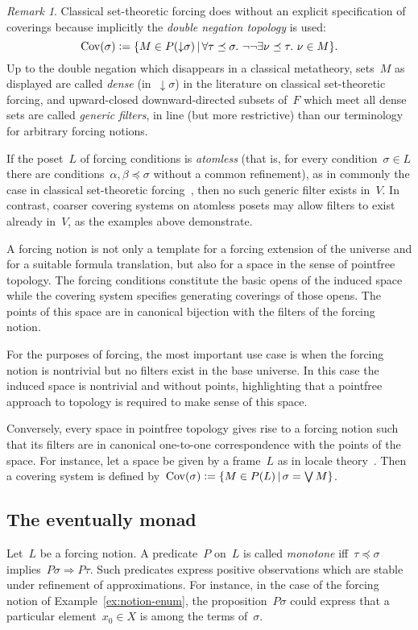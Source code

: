 \documentclass[com,11pt,crcready]{iosart2x}
\theoremstyle{definition}
\theoremstyle{plain}
\theoremstyle{remark}
\newtheorem{remark}[definition]{Remark}
\newcommand{\?}{\,{:}\,}
\newcommand{\defeq}{\vcentcolon=}
\newcommand{\Cov}{\mathrm{Cov}}
\renewcommand{\_}{\mathpunct{.}\,}
\begin{document}
\begin{remark}Classical set-theoretic forcing
does without an explicit specification of coverings because implicitly the
\emph{double negation topology} is used:
\[ \Cov(\sigma) \defeq \{ M \in P({\downarrow}\sigma) \,|\,
  \forall \tau \preceq \sigma\_ \neg\neg \exists \nu \preceq \tau\_ \nu \in M
  \}. \]
Up to the double negation which disappears in a classical metatheory, sets~$M$ as displayed are called
\emph{dense} (in~${\downarrow}\sigma$) in the literature on classical set-theoretic forcing, and
upward-closed downward-directed subsets of~$F$ which meet all dense sets are
called \emph{generic filters}, in line (but more restrictive) than our
terminology for arbitrary forcing notions.

If the poset~$L$ of forcing conditions is \emph{atomless} (that is, for every
condition~$\sigma \in L$ there are conditions~$\alpha,\beta \preceq \sigma$
without a common refinement), as in commonly the case in classical
set-theoretic forcing~\cite[Lemma~1.33]{schilhan:bsc}, then no such generic filter exists in~$V$.
In contrast, coarser covering systems on atomless posets may allow
filters to exist already in~$V$, as the examples above demonstrate.
\end{remark}

A forcing notion is not only a template for a forcing extension of the universe and
for a suitable formula translation, but also for a space in the sense of
pointfree topology. The forcing conditions constitute the basic opens of the
induced space while the covering system specifies generating coverings of
those opens. The points of this space are in canonical bijection with the
filters of the forcing notion.

For the purposes of forcing, the most important use case is when the forcing
notion is nontrivial but no filters exist in the base universe. In this case
the induced space is nontrivial and without points, highlighting that a
pointfree approach to topology is required to make sense of this space.

Conversely, every space in pointfree topology gives rise to a forcing notion such that its
filters are in canonical one-to-one correspondence with the points of the space.
For instance, let a space be given by a frame~$L$ as in locale
theory~\cite{picado-pultr:frames-and-locales}. Then a covering system is
defined by~$\Cov(\sigma) \defeq \{ M \in P(L) \,|\, \sigma = \bigvee M \}$.


\subsection{The eventually monad} Let~$L$ be a forcing notion. A
predicate~$P$ on~$L$ is called \emph{monotone} iff~$\tau \preceq \sigma$
implies~$P\sigma \Rightarrow P\tau$. Such predicates express positive
observations which are stable under refinement of approximations. For
instance, in the case of the forcing notion of Example~\ref{ex:notion-enum},
the proposition~$P\sigma$ could express that a particular element~$x_0 \in X$
is among the terms of~$\sigma$.
\end{document}
